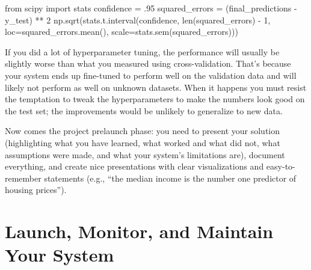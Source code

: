 \begin{pyc}
from scipy import stats
confidence = .95
squared_errors = (final_predictions - y_test) ** 2
np.sqrt(stats.t.interval(confidence, len(squared_errors) - 1,
                         loc=squared_errors.mean(),
                         scale=stats.sem(squared_errors)))
\end{pyc}

If you did a lot of hyperparameter tuning, the performance will usually be slightly worse than what you measured using cross-validation. That's because your system ends up fine-tuned to perform well on the validation data and will likely not perform as well on unknown datasets. When it happens you must resist the temptation to tweak the hyperparameters to make the numbers look good on the test
set; the improvements would be unlikely to generalize to new data.

Now comes the project prelaunch phase: you need to present your solution (highlighting what you have learned, what worked and what did not, what assumptions were made, and what your system's limitations are), document everything, and create nice presentations with clear visualizations and easy-to-remember statements (e.g., ``the median income is the number one predictor of housing prices”).
\section{Launch, Monitor, and Maintain Your System}

